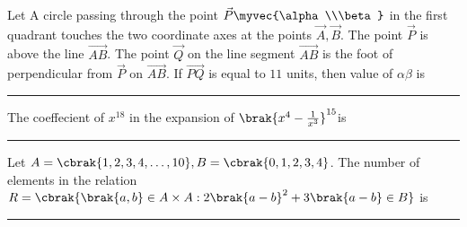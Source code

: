 	\item Let A circle passing through the point $\vec{P}\myvec{\alpha\\\beta}$ in the first quadrant touches the two coordinate axes at the points $\vec{A},\vec{B}$. The point $\vec{P}$ is above the line $\vec{AB}$. The point $\vec{Q}$ on the line segment $\vec{AB}$ is the foot of perpendicular from $\vec{P}$ on $\vec{AB}$. If $\vec{PQ}$ is equal to $11$ units, then value of $\alpha\beta$ is \rule{2cm}{0.2pt}\hfill{}
	\item The coeffecient of $x^{18}$ in the expansion of $\brak{x^4-\frac{1}{x^3}}^{15}$is \rule{2cm}{0.2pt}\hfill{}
	\item Let $A=\cbrak{1,2,3,4,\dots,10}, B=\cbrak{0,1,2,3,4}$. The number of elements in the relation $R=\cbrak{\brak{a,b}\in A \times A: 2\brak{a-b}^2+3\brak{a-b} \in B}$ is \rule{2cm}{0.2pt}\hfill{}

